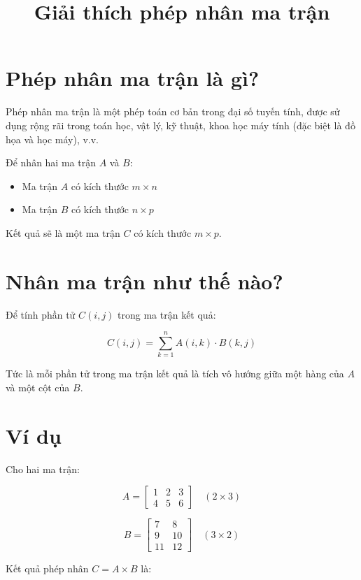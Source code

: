 \documentclass[12pt]{article}
\title{Giải thích phép nhân ma trận}
\author{}
\date{}
\begin{document}
\maketitle

\section*{Phép nhân ma trận là gì?}

Phép nhân ma trận là một phép toán cơ bản trong đại số tuyến tính, được sử dụng rộng rãi trong toán học, vật lý, kỹ thuật, khoa học máy tính (đặc biệt là đồ họa và học máy), v.v.

Để nhân hai ma trận $A$ và $B$:

\begin{itemize}
    \item Ma trận $A$ có kích thước $m \times n$
    \item Ma trận $B$ có kích thước $n \times p$
\end{itemize}

Kết quả sẽ là một ma trận $C$ có kích thước $m \times p$.

\section*{Nhân ma trận như thế nào?}

Để tính phần tử $C(i, j)$ trong ma trận kết quả:

\[
C(i, j) = \sum_{k=1}^{n} A(i, k) \cdot B(k, j)
\]

Tức là mỗi phần tử trong ma trận kết quả là tích vô hướng giữa một hàng của $A$ và một cột của $B$.

\section*{Ví dụ}

Cho hai ma trận:

\[
A = \begin{bmatrix}
1 & 2 & 3 \\
4 & 5 & 6
\end{bmatrix} \quad (2 \times 3)
\]

\[
B = \begin{bmatrix}
7 & 8 \\
9 & 10 \\
11 & 12
\end{bmatrix} \quad (3 \times 2)
\]

Kết quả phép nhân $C = A \times B$ là:
\end{document}
